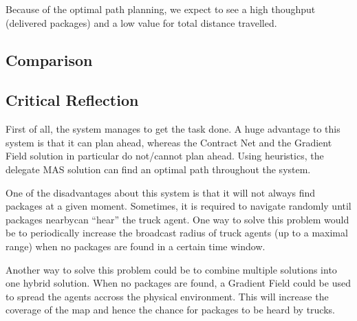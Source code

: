 \npar  Because of the optimal path planning, we expect to see a high thoughput
(delivered packages) and a low value for total distance travelled.

\subsection{Comparison}


\subsection{Critical Reflection}

\npar First of all, the system manages to get the task done. A huge advantage
to this system is that it can plan ahead, whereas the Contract Net and the 
Gradient Field solution in particular do not/cannot plan ahead. Using
heuristics, the delegate MAS solution can find an optimal path throughout the
system.

\npar One of the disadvantages about this system is that it will not always find
packages at a given moment. Sometimes, it is required to navigate randomly until
packages nearbycan ``hear'' the truck agent. One way to solve this problem would
be to periodically increase the broadcast radius of truck agents (up to a
maximal range) when no packages are found in a certain time window.

\npar Another way to solve this problem could be to combine multiple solutions
into one hybrid solution. When no packages are found, a Gradient Field could be
used to spread the agents accross the physical environment. This will increase
the coverage of the map and hence the chance for packages to be heard by trucks.

\npar %
